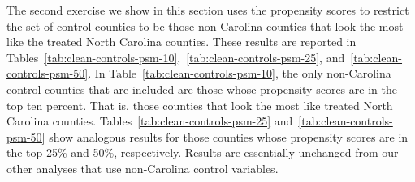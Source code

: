 \documentclass[12pt]{article}
\begin{document}
The second exercise we show in this section uses the propensity scores to restrict the set of control counties to be those non-Carolina counties that look the most like the treated North Carolina counties. 
These results are reported in Tables~\ref{tab:clean-controls-psm-10},~\ref{tab:clean-controls-psm-25}, and~\ref{tab:clean-controls-psm-50}. 
In Table~\ref{tab:clean-controls-psm-10}, the only non-Carolina control counties that are included are those whose propensity scores are in the top ten percent. 
That is, those counties that look the most like treated North Carolina counties. 
Tables~\ref{tab:clean-controls-psm-25} and~\ref{tab:clean-controls-psm-50} show analogous results for those counties whose propensity scores are in the top 25\% and 50\%, respectively. 
Results are essentially unchanged from our other analyses that use non-Carolina control variables.
\end{document}
